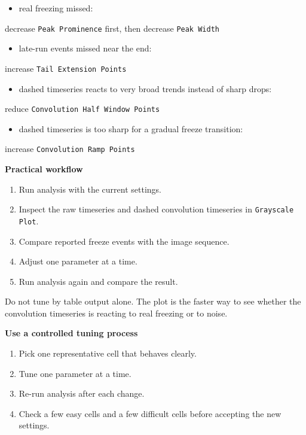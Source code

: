 \documentclass[
  9pt,
  letterpaper,
  oneside,
  open=any,
  DIV=15,
  parskip=half-,
  headings=big,
  numbers=noenddot
]{scrbook}
\newcommand{\manuallead}[1]{%
  \vspace{0.15em}%
  {\sffamily\bfseries\color{ManualBlue}#1}\par\nobreak\vspace{0.05em}%
}
\begin{document}
\begin{itemize}[leftmargin=*,itemsep=0.35em,topsep=0.4em]
\item real freezing missed:
\end{itemize}

decrease \texttt{Peak Prominence} first, then decrease \texttt{Peak Width}


\begin{itemize}[leftmargin=*,itemsep=0.35em,topsep=0.4em]
\item late-run events missed near the end:
\end{itemize}

increase \texttt{Tail Extension Points}


\begin{itemize}[leftmargin=*,itemsep=0.35em,topsep=0.4em]
\item dashed timeseries reacts to very broad trends instead of sharp drops:
\end{itemize}

reduce \texttt{Convolution Half Window Points}


\begin{itemize}[leftmargin=*,itemsep=0.35em,topsep=0.4em]
\item dashed timeseries is too sharp for a gradual freeze transition:
\end{itemize}

increase \texttt{Convolution Ramp Points}


\manuallead{Practical workflow}

\begin{enumerate}[leftmargin=*,itemsep=0.35em,topsep=0.4em]
\item Run analysis with the current settings.
\item Inspect the raw timeseries and dashed convolution timeseries in \texttt{Grayscale Plot}.
\item Compare reported freeze events with the image sequence.
\item Adjust one parameter at a time.
\item Run analysis again and compare the result.
\end{enumerate}

Do not tune by table output alone. The plot is the faster way to see whether the convolution timeseries is reacting to real freezing or to noise.


\manuallead{Use a controlled tuning process}

\begin{enumerate}[leftmargin=*,itemsep=0.35em,topsep=0.4em]
\item Pick one representative cell that behaves clearly.
\item Tune one parameter at a time.
\item Re-run analysis after each change.
\item Check a few easy cells and a few difficult cells before accepting the new settings.
\end{enumerate}
\end{document}
